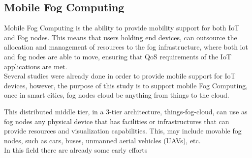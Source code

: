 \subsection{Mobile Fog Computing}
\label{sec:Mobility}
Mobile Fog Computing is the ability to provide mobility support for both IoT and
Fog nodes. This means that users holding end devices, can outsource the
allocation and management of resources to the fog infrastructure, where both iot
and fog nodes are able to move, ensuring that QoS requirements of the IoT
applications are met.\\
Several studies were already done in order to provide mobile support for IoT
devices, however, the purpose of this study is to support mobile Fog Computing,
once in smart cities, fog nodes cloud be anything from things to the cloud.

This distributed middle tier, in a 3-tier architecture, things-fog-cloud, can
use as fog nodes any physical device that has facilities or infrastructures that
can provide resources and visualization capabilities.  This, may include movable
fog nodes, such as cars, buses, unmanned aerial vehicles (UAVs), etc.\\
In this field there are already some early efforts




